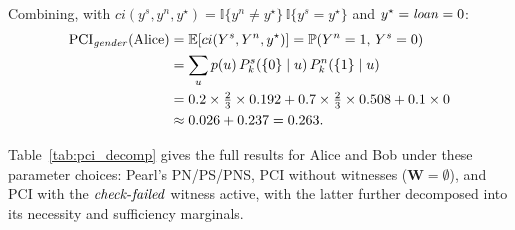 Combining, with $ci(y^s,y^n,y^\star)=\mathbb{I}\{y^n\neq y^\star\}\,\mathbb{I}\{y^s=y^\star\}$
and $y^\star=\varname{loan}=0$:
\begin{align*}
\mathrm{PCI}_{\varname{gender}}(\text{Alice})
  &= \mathbb{E}\!\left[ci(Y^s,Y^n,y^\star)\right]
   = \mathbb{P}(Y^n=1,\,Y^s=0) \\
  &= \sum_u p(u)\,P_k^s(\{0\}\mid u)\,P_k^n(\{1\}\mid u) \\
  &= 0.2\times\tfrac{2}{3}\times 0.192
   + 0.7\times\tfrac{2}{3}\times 0.508
   + 0.1\times 0 \\
  &\approx 0.026 + 0.237 = 0.263.
\end{align*}

Table~\ref{tab:pci_decomp} gives the full results for Alice and Bob under these
parameter choices: Pearl's PN/PS/PNS, PCI without witnesses
($\mathbf{W}=\emptyset$), and PCI with the $\varname{check\text{-}failed}$ witness
active, with the latter further decomposed into its necessity and sufficiency
marginals.

